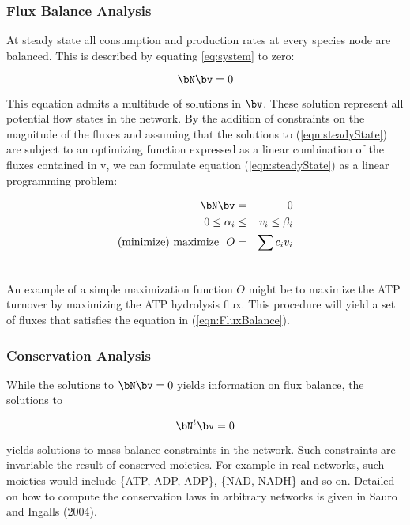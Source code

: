 \subsubsection{Flux Balance Analysis}

At steady state all consumption and production rates at every species
node are balanced. This is described by equating \ref{eq:system} to zero:

$$ \bN \bv = 0 $$ \label{eqn:steadyState}

This equation admits a multitude of solutions in $\bv$. These
solution represent all potential flow states in the network. By
the addition of constraints on the magnitude of the fluxes and
assuming that the solutions to (\ref{eqn:steadyState}) are subject
to an optimizing function expressed as a linear combination of the
fluxes contained in v, we can formulate equation
(\ref{eqn:steadyState}) as a linear programming problem:

\begin{eqnarray} \label{eqn:FluxBalance}
\bN \bv &=& 0 \\ \nonumber
0 \leq \alpha_i &\leq& v_i \leq \beta_i \\ \nonumber
\mbox{(minimize) maximize } \mbox{ } O &=& \sum c_i v_i \\ \nonumber
\end{eqnarray}

An example of a simple maximization function $O$ might be to
maximize the ATP turnover by maximizing the ATP hydrolysis flux.
This procedure will yield a set of fluxes that satisfies the
equation in (\ref{eqn:FluxBalance}).

\subsubsection{Conservation Analysis}

While the solutions to $\bN \bv = 0$ yields information on flux
balance, the solutions to

$$ \bN^t \bv = 0$$

yields solutions to mass balance constraints in the network. Such
constraints are invariable the result of conserved moieties. For
example in real networks, such moieties would include \{ATP, ADP,
ADP\}, \{NAD, NADH\} and so on. Detailed on how to compute the
conservation laws in arbitrary networks is given in Sauro and
Ingalls (2004).

